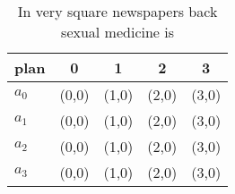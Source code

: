\documentclass[a4paper]{article}
\begin{document}
\begin{table}
\begin{adjustbox}{width=0.5\columnwidth}
\begin{tabular}{|l|l|l|l|l|}
\hline
\textbf{plan} & \multicolumn{1}{c|}{\textbf{0}} & \multicolumn{1}{c|}{\textbf{1}} & \multicolumn{1}{c|}{\textbf{2}} & \multicolumn{1}{c|}{\textbf{3}} \\ \hline
\textbf{$a_0$}  & (0,0) & (1,0) & (2,0) & (3,0) \\ \hline
\textbf{$a_1$}  & (0,0) & (1,0) & (2,0) & (3,0) \\ \hline
\textbf{$a_2$}  & (0,0) & (1,0) & (2,0) & (3,0) \\ \hline
\textbf{$a_3$}  & (0,0) & (1,0) & (2,0) & (3,0) \\ \hline
\end{tabular}
\end{adjustbox}
\caption{In very square newspapers back sexual medicine is
}
\end{table}
\end{document}
